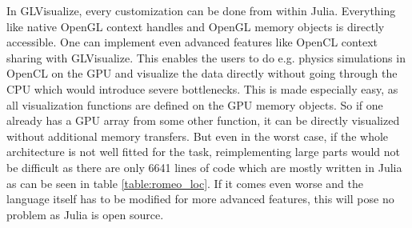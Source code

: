 In GLVisualize, every customization can be done from within Julia.
Everything like native \ac{OpenGL} context handles and \ac{OpenGL} memory objects is directly accessible.
One can implement even advanced features like \ac{OpenCL} context sharing with GLVisualize\cite{OCLInterop}.
This enables the users to do e.g. physics simulations in \ac{OpenCL} on the \ac{GPU} and visualize the data directly without going through the \ac{CPU} which would introduce severe bottlenecks.
This is made especially easy, as all visualization functions are defined on the \ac{GPU} memory objects. 
So if one already has a \ac{GPU} array from some other function, it can be directly visualized without additional memory transfers.
But even in the worst case, if the whole architecture is not well fitted for the task, reimplementing large parts would not be difficult as there are only 6641 lines of code which are mostly written in Julia as can be seen in table \ref{table:romeo_loc}.
If it comes even worse and the language itself has to be modified for more advanced features, this will pose no problem as Julia is open source.
